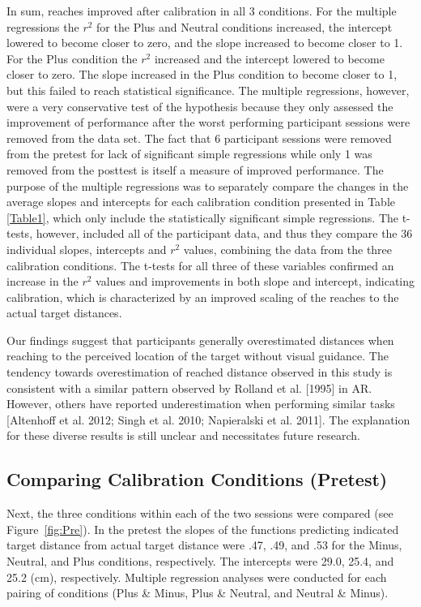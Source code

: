 In sum, reaches improved after calibration in all 3 conditions. For the multiple regressions the $r^2$ for the Plus and Neutral conditions increased, the intercept lowered to become closer to zero, and the slope increased to become closer to 1. For the Plus condition the $r^2$ increased and the intercept lowered to become closer to zero. The slope increased in the Plus condition to become closer to 1, but this failed to reach statistical significance. The multiple regressions, however, were a very conservative test of the hypothesis because they only assessed the improvement of performance after the worst performing participant sessions were removed from the data set. The fact that 6 participant sessions were removed from the pretest for lack of significant simple regressions while only 1 was removed from the posttest is itself a measure of improved performance. The purpose of the multiple regressions was to separately compare the changes in the average slopes and intercepts for each calibration condition presented in Table \ref{Table1}, which only include the statistically significant simple regressions.
The t-tests, however, included all of the participant data, and thus they compare the 36 individual slopes, intercepts and $r^2$ values, combining the data from the three calibration conditions. The t-tests for all three of these variables confirmed an increase in the $r^2$ values and improvements in both slope and intercept, indicating calibration, which is characterized by an improved scaling of the reaches to the actual target distances.

Our findings suggest that participants generally overestimated distances when reaching to the perceived location of the target without visual guidance. The tendency towards overestimation of reached distance observed in this study is consistent with a similar pattern observed by Rolland et al. [1995] in AR. However, others have reported underestimation when performing similar tasks [Altenhoff et al. 2012; Singh et al. 2010; Napieralski et al. 2011]. The explanation for these diverse results is still unclear and necessitates future research.


\subsection{Comparing Calibration Conditions (Pretest)}
Next, the three conditions within each of the two sessions were compared (see Figure~\ref{fig:Pre}). In the pretest the slopes of the functions predicting indicated target distance from actual target distance were .47, .49, and .53 for the Minus, Neutral, and Plus conditions, respectively. The intercepts were 29.0, 25.4, and 25.2 (cm), respectively. Multiple regression analyses were conducted for each pairing of conditions (Plus \& Minus, Plus \& Neutral, and Neutral \& Minus).

